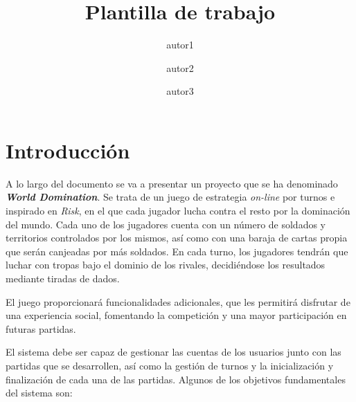 \documentclass[11pt, a4paper, titlepage]{article}
\title{Plantilla de trabajo}
\author{autor1 \and autor2 \and autor3}
\date{\monthyear}
\begin{document}
 


\begin{titlepage}

\thispagestyle{empty}


\end{titlepage}
\newpage





\thispagestyle{empty}
\fontsize{11pt}{11pt}\selectfont

\setcounter{tocdepth}{2}

{
    \hypersetup{linkcolor=black}
    \doublespacing
    \tableofcontents
}

\thispagestyle{empty}

\clearpage
\setcounter{page}{1}
\section{Introducción}
A lo largo del documento se va a presentar un proyecto que se ha denominado\textit{ \textbf{World Domination}}. Se trata de un juego de estrategia \textit{on-line} por turnos e inspirado en \textit{Risk}, en el que cada jugador lucha contra el resto por la dominación del mundo. Cada uno de los jugadores cuenta con un número de soldados y territorios controlados por los mismos, así como con una baraja de cartas propia que serán canjeadas por más soldados. En cada turno, los jugadores tendrán que luchar con tropas bajo el dominio de los rivales, decidiéndose los resultados mediante tiradas de dados. \newline

El juego proporcionará funcionalidades adicionales, que les permitirá disfrutar de una experiencia social, fomentando la competición y una mayor participación en futuras partidas. \newline

El sistema debe ser capaz de gestionar las cuentas de los usuarios junto con las partidas que se desarrollen, así como la gestión de turnos y la inicialización y finalización de cada una de las partidas. Algunos de los objetivos fundamentales del sistema son: 
\end{document}
